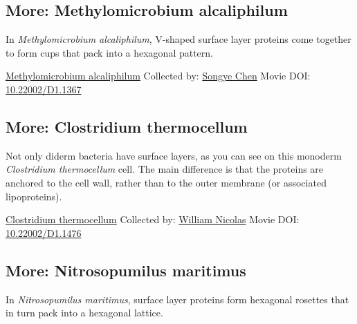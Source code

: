 \documentclass[]{tufte-book}
\begin{document}
\hypertarget{Methylomicrobium_alcaliphilum}{%
\subsection*{More: Methylomicrobium alcaliphilum}\label{Methylomicrobium_alcaliphilum}}

In \emph{Methylomicrobium alcaliphilum}, V-shaped surface layer proteins come together to form cups that pack into a hexagonal pattern.



\hypertarget{htmlwidget-b6f4bae8bb02e0c89925}{}

\label{fig:2-7a}\protect\hyperlink{tree}{Methylomicrobium alcaliphilum} Collected by: \protect\hyperlink{songye_chen}{Songye Chen} Movie DOI: \href{https://doi.org/10.22002/D1.1367}{10.22002/D1.1367}

\hypertarget{Clostridium_thermocellum}{%
\subsection*{More: Clostridium thermocellum}\label{Clostridium_thermocellum}}

Not only diderm bacteria have surface layers, as you can see on this monoderm \emph{Clostridium thermocellum} cell. The main difference is that the proteins are anchored to the cell wall, rather than to the outer membrane (or associated lipoproteins).



\hypertarget{htmlwidget-dc4abbf803ec2dc5ee19}{}

\label{fig:2-7b}\protect\hyperlink{tree}{Clostridium thermocellum} Collected by: \protect\hyperlink{william_nicolas}{William Nicolas} Movie DOI: \href{https://doi.org/10.22002/D1.1476}{10.22002/D1.1476}

\hypertarget{Nitrosopumilus_maritimus}{%
\subsection*{More: Nitrosopumilus maritimus}\label{Nitrosopumilus_maritimus}}

In \emph{Nitrosopumilus maritimus}, surface layer proteins form hexagonal rosettes that in turn pack into a hexagonal lattice.
\end{document}

